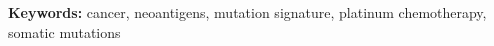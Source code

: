 \textbf{Keywords:} cancer, neoantigens, mutation signature, platinum chemotherapy, somatic mutations